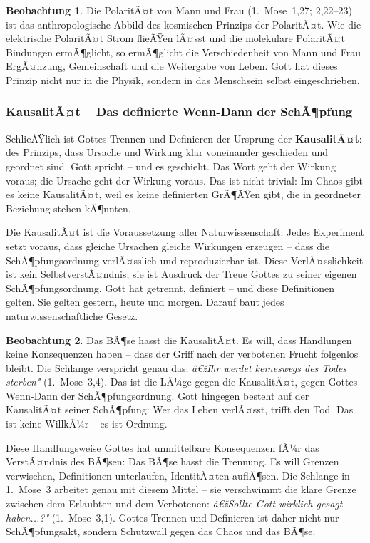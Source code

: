 ﻿\documentclass[a4paper,12pt]{article}
\theoremstyle{definition}
\newtheorem{observation}{Beobachtung}[section]
\begin{document}
\begin{observation}
	Die PolaritÃ¤t von Mann und Frau (1.~Mose~1,27; 2,22--23) ist das anthropologische
	Abbild des kosmischen Prinzips der PolaritÃ¤t. Wie die elektrische PolaritÃ¤t
	Strom flieÃŸen lÃ¤sst und die molekulare PolaritÃ¤t Bindungen ermÃ¶glicht, so
	ermÃ¶glicht die Verschiedenheit von Mann und Frau ErgÃ¤nzung, Gemeinschaft und
	die Weitergabe von Leben. Gott hat dieses Prinzip nicht nur in die Physik,
	sondern in das Menschsein selbst eingeschrieben.
\end{observation}

\subsubsection{KausalitÃ¤t -- Das definierte Wenn-Dann der SchÃ¶pfung}

SchlieÃŸlich ist Gottes Trennen und Definieren der Ursprung der \textbf{KausalitÃ¤t}:
des Prinzips, dass Ursache und Wirkung klar voneinander geschieden und geordnet
sind. Gott spricht -- und es geschieht. Das Wort geht der Wirkung voraus; die
Ursache geht der Wirkung voraus. Das ist nicht trivial: Im Chaos gibt es keine
KausalitÃ¤t, weil es keine definierten GrÃ¶ÃŸen gibt, die in geordneter Beziehung
stehen kÃ¶nnten.

Die KausalitÃ¤t ist die Voraussetzung aller Naturwissenschaft: Jedes Experiment
setzt voraus, dass gleiche Ursachen gleiche Wirkungen erzeugen -- dass die
SchÃ¶pfungsordnung verlÃ¤sslich und reproduzierbar ist. Diese VerlÃ¤sslichkeit ist
kein SelbstverstÃ¤ndnis; sie ist Ausdruck der Treue Gottes zu seiner eigenen
SchÃ¶pfungsordnung. Gott hat getrennt, definiert -- und diese Definitionen gelten.
Sie gelten gestern, heute und morgen. Darauf baut jedes naturwissenschaftliche
Gesetz.

\begin{observation}
	Das BÃ¶se hasst die KausalitÃ¤t. Es will, dass Handlungen keine Konsequenzen
	haben -- dass der Griff nach der verbotenen Frucht folgenlos bleibt. Die
	Schlange verspricht genau das: \textit{â€žIhr werdet keineswegs des Todes sterben"}
	(1.~Mose~3,4). Das ist die LÃ¼ge gegen die KausalitÃ¤t, gegen Gottes Wenn-Dann
	der SchÃ¶pfungsordnung. Gott hingegen besteht auf der KausalitÃ¤t seiner SchÃ¶pfung:
	Wer das Leben verlÃ¤sst, trifft den Tod. Das ist keine WillkÃ¼r -- es ist Ordnung.
\end{observation}

Diese Handlungsweise Gottes hat unmittelbare Konsequenzen fÃ¼r das VerstÃ¤ndnis
des BÃ¶sen: Das BÃ¶se hasst die Trennung. Es will Grenzen verwischen, Definitionen
unterlaufen, IdentitÃ¤ten auflÃ¶sen. Die Schlange in 1.~Mose~3 arbeitet genau mit
diesem Mittel -- sie verschwimmt die klare Grenze zwischen dem Erlaubten und dem
Verbotenen: \textit{â€žSollte Gott wirklich gesagt haben...?"} (1.~Mose~3,1).
Gottes Trennen und Definieren ist daher nicht nur SchÃ¶pfungsakt, sondern
Schutzwall gegen das Chaos und das BÃ¶se.
\end{document}
